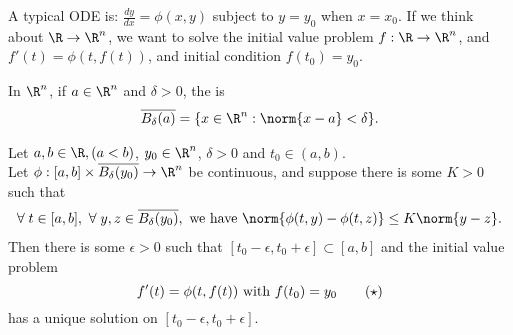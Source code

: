A typical ODE is: $\frac{dy}{dx} = \phi(x,y)$ subject to $y=y_0$ when $x= x_0$. If we think about $\R\to\R^n$, we want to solve the initial value problem $f:\R\to\R^n$, and $f'(t) = \phi(t,f(t))$, and initial condition $f(t_0) = y_0$.

\begin{definition}
    In $\R^n$, if $a\in \R^n$ and $\delta >0$, the  is
    \begin{align*}
        \overline{B_\delta(a)} = \Set{x\in \R^n}{\norm{x-a} < \delta}.
    \end{align*} 
\end{definition}

\begin{theorem} \label{thm:2.15}
    Let $a, b \in \R, (a<b)$, $y_0\in \R^n$, $\delta>0$ and $t_0\in (a,b)$. \\
    Let $\phi: [a,b] \times \overline{B_\delta(y_0)} \to \R^n$ be continuous, and suppose there is some $K>0$ such that 
    \begin{align*}
        \forall \; t\in [a,b],\ \forall \; y,z\in \overline{B_\delta(y_0)}, \textup{ we have } \norm{\phi(t,y) - \phi(t,z)} \leq K\norm{y-z}.
    \end{align*} 
    Then there is some $\epsilon>0$ such that $[t_0-\epsilon, t_0+\epsilon] \subset [a,b]$ and the initial value problem \[f'(t) =\phi(t,f(t)) \textup{ with } f(t_0) = y_0 \tag{$\star$} \] has a unique solution on $[t_0-\epsilon, t_0+\epsilon]$.
\end{theorem}


